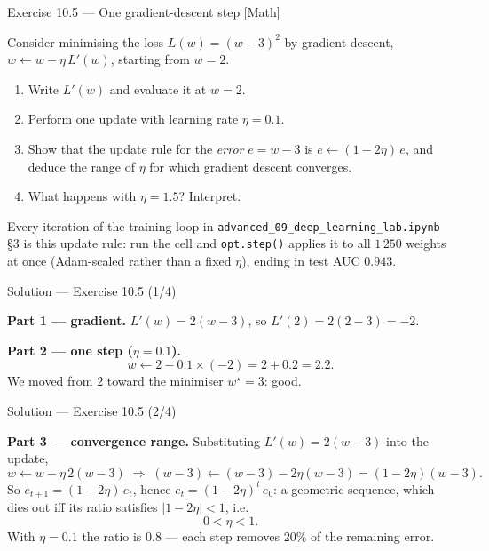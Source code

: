 \documentclass[aspectratio=169,11pt]{beamer}
\begin{document}
\begin{frame}{Exercise 10.5 --- One gradient-descent step [Math]}
\begin{exercise}
  Consider minimising the loss $L(w) = (w - 3)^2$ by gradient
  descent, $w \leftarrow w - \eta\, L'(w)$, starting from $w = 2$.
  \begin{enumerate}
    \item Write $L'(w)$ and evaluate it at $w = 2$.
    \item Perform one update with learning rate $\eta = 0.1$.
    \item Show that the update rule for the \emph{error} $e = w - 3$
          is $e \leftarrow (1 - 2\eta)\,e$, and deduce the range of
          $\eta$ for which gradient descent converges.
    \item What happens with $\eta = 1.5$? Interpret.
  \end{enumerate}
\end{exercise}
\begin{labnote}
  Every iteration of the training loop in \texttt{advanced\_09\_deep\_learning\_lab.ipynb} \S3 is this
  update rule: run the cell and \texttt{opt.step()} applies it to all $1\,250$ weights
  at once (Adam-scaled rather than a fixed $\eta$), ending in test AUC $0.943$.
\end{labnote}
\end{frame}

\begin{frame}{Solution --- Exercise 10.5 (1/4)}
\begin{solutionbox}
  \textbf{Part 1 --- gradient.}
  $L'(w) = 2(w - 3)$, so $L'(2) = 2(2 - 3) = -2$.

  \medskip
  \textbf{Part 2 --- one step ($\eta = 0.1$).}
  \[
    w \leftarrow 2 - 0.1 \times (-2) = 2 + 0.2 = 2.2 .
  \]
  We moved from $2$ toward the minimiser $w^\star = 3$: good.
\end{solutionbox}
\end{frame}

\begin{frame}{Solution --- Exercise 10.5 (2/4)}
\begin{solutionbox}
  \medskip
  \textbf{Part 3 --- convergence range.} Substituting $L'(w) = 2(w-3)$
  into the update,
  \[
    w \leftarrow w - \eta\, 2(w - 3)
    \;\Longrightarrow\;
    (w - 3) \leftarrow (w - 3) - 2\eta (w - 3) = (1 - 2\eta)(w - 3).
  \]
  So $e_{t+1} = (1 - 2\eta)\, e_t$, hence $e_t = (1 - 2\eta)^t\, e_0$: a
  geometric sequence, which dies out iff its ratio satisfies
  $|1 - 2\eta| < 1$, i.e.
  \[
    0 < \eta < 1 .
  \]
  With $\eta = 0.1$ the ratio is $0.8$ --- each step removes $20\%$ of the
  remaining error.
\end{solutionbox}
\end{frame}
\end{document}
